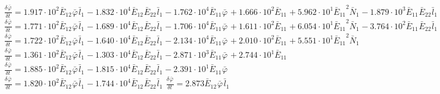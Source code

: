 $\frac{{\delta}^{} {\bar{\varphi}}_{}}{{\delta} {{{t}}_{}}^{}} = 1.917\cdot 10^{2}{{{\bar{E}}_{12}}^{}{{\bar{\varphi}}_{}}^{}{{\bar{l}}_{1}}^{}} - 1.832\cdot 10^{4}{{{\bar{E}}_{12}}^{}{{\bar{E}}_{22}}^{}{{\bar{l}}_{1}}^{}} - 1.762\cdot 10^{4}{{{\bar{E}}_{11}}^{}{{\bar{\varphi}}_{}}^{}} + 1.666\cdot 10^{2}{{{\bar{E}}_{11}}^{}} + 5.962\cdot 10^{1}{{{\bar{E}}_{11}}^{2}{{\bar{N}}_{1}}^{}} - 1.879\cdot 10^{3}{{{\bar{E}}_{11}}^{}{{\bar{E}}_{22}}^{}{{\bar{l}}_{1}}^{}} + 1.524\cdot 10^{1}{{{\bar{E}}_{11}}^{}{{\bar{\varphi}}_{}}^{}{{\bar{l}}_{1}}^{}}$
$\frac{{\delta}^{} {\bar{\varphi}}_{}}{{\delta} {{{t}}_{}}^{}} = 1.771\cdot 10^{2}{{{\bar{E}}_{12}}^{}{{\bar{\varphi}}_{}}^{}{{\bar{l}}_{1}}^{}} - 1.689\cdot 10^{4}{{{\bar{E}}_{12}}^{}{{\bar{E}}_{22}}^{}{{\bar{l}}_{1}}^{}} - 1.706\cdot 10^{4}{{{\bar{E}}_{11}}^{}{{\bar{\varphi}}_{}}^{}} + 1.611\cdot 10^{2}{{{\bar{E}}_{11}}^{}} + 6.054\cdot 10^{1}{{{\bar{E}}_{11}}^{2}{{\bar{N}}_{1}}^{}} - 3.764\cdot 10^{2}{{{\bar{E}}_{11}}^{}{{\bar{E}}_{22}}^{}{{\bar{l}}_{1}}^{}}$
$\frac{{\delta}^{} {\bar{\varphi}}_{}}{{\delta} {{{t}}_{}}^{}} = 1.722\cdot 10^{2}{{{\bar{E}}_{12}}^{}{{\bar{\varphi}}_{}}^{}{{\bar{l}}_{1}}^{}} - 1.640\cdot 10^{4}{{{\bar{E}}_{12}}^{}{{\bar{E}}_{22}}^{}{{\bar{l}}_{1}}^{}} - 2.134\cdot 10^{4}{{{\bar{E}}_{11}}^{}{{\bar{\varphi}}_{}}^{}} + 2.010\cdot 10^{2}{{{\bar{E}}_{11}}^{}} + 5.551\cdot 10^{1}{{{\bar{E}}_{11}}^{2}{{\bar{N}}_{1}}^{}}$
$\frac{{\delta}^{} {\bar{\varphi}}_{}}{{\delta} {{{t}}_{}}^{}} = 1.361\cdot 10^{2}{{{\bar{E}}_{12}}^{}{{\bar{\varphi}}_{}}^{}{{\bar{l}}_{1}}^{}} - 1.303\cdot 10^{4}{{{\bar{E}}_{12}}^{}{{\bar{E}}_{22}}^{}{{\bar{l}}_{1}}^{}} - 2.871\cdot 10^{3}{{{\bar{E}}_{11}}^{}{{\bar{\varphi}}_{}}^{}} + 2.744\cdot 10^{1}{{{\bar{E}}_{11}}^{}}$
$\frac{{\delta}^{} {\bar{\varphi}}_{}}{{\delta} {{{t}}_{}}^{}} = 1.885\cdot 10^{2}{{{\bar{E}}_{12}}^{}{{\bar{\varphi}}_{}}^{}{{\bar{l}}_{1}}^{}} - 1.815\cdot 10^{4}{{{\bar{E}}_{12}}^{}{{\bar{E}}_{22}}^{}{{\bar{l}}_{1}}^{}} - 2.391\cdot 10^{1}{{{\bar{E}}_{11}}^{}{{\bar{\varphi}}_{}}^{}}$
$\frac{{\delta}^{} {\bar{\varphi}}_{}}{{\delta} {{{t}}_{}}^{}} = 1.820\cdot 10^{2}{{{\bar{E}}_{12}}^{}{{\bar{\varphi}}_{}}^{}{{\bar{l}}_{1}}^{}} - 1.744\cdot 10^{4}{{{\bar{E}}_{12}}^{}{{\bar{E}}_{22}}^{}{{\bar{l}}_{1}}^{}}$
$\frac{{\delta}^{} {\bar{\varphi}}_{}}{{\delta} {{{t}}_{}}^{}} = 2.873{{{\bar{E}}_{12}}^{}{{\bar{\varphi}}_{}}^{}{{\bar{l}}_{1}}^{}}$
